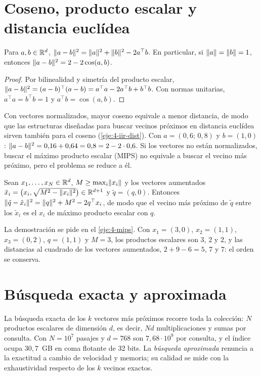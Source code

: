 \section{Coseno, producto escalar y distancia euclídea}

\begin{teorema}\label{teo:dist-coseno}
Para $a,b\in\mathbb{R}^{d}$, $\lVert a-b\rVert^{2}=\lVert a\rVert^{2}+\lVert b\rVert^{2}-2a^{\top}b$. En particular, si $\lVert a\rVert=\lVert b\rVert=1$, entonces $\lVert a-b\rVert^{2}=2-2\cos(a,b)$.
\end{teorema}

\begin{proof}
Por bilinealidad y simetría del producto escalar, $\lVert a-b\rVert^{2}=(a-b)^{\top}(a-b)=a^{\top}a-2a^{\top}b+b^{\top}b$. Con normas unitarias, $a^{\top}a=b^{\top}b=1$ y $a^{\top}b=\cos(a,b)$.
\end{proof}

Con vectores normalizados, mayor coseno equivale a menor distancia, de modo que las estructuras diseñadas para buscar vecinos próximos en distancia euclídea sirven también para el coseno (\cref{eje:4-iir-dist}). Con $a=(0{,}6;\,0{,}8)$ y $b=(1,0)$: $\lVert a-b\rVert^{2}=0{,}16+0{,}64=0{,}8=2-2\cdot 0{,}6$. Si los vectores no están normalizados, buscar el máximo producto escalar (MIPS) no equivale a buscar el vecino más próximo, pero el problema se reduce a él.

\begin{proposicion}\label{prop:mips}
Sean $x_1,\dots,x_N\in\mathbb{R}^{d}$, $M\ge\max_i\lVert x_i\rVert$ y los vectores aumentados $\tilde x_i=\bigl(x_i,\sqrt{M^{2}-\lVert x_i\rVert^{2}}\bigr)\in\mathbb{R}^{d+1}$ y $\tilde q=(q,0)$. Entonces $\lVert\tilde q-\tilde x_i\rVert^{2}=\lVert q\rVert^{2}+M^{2}-2q^{\top}x_i$, de modo que el vecino más próximo de $\tilde q$ entre los $\tilde x_i$ es el $x_i$ de máximo producto escalar con $q$.
\end{proposicion}

La demostración se pide en el \cref{eje:4-mips}. Con $x_1=(3,0)$, $x_2=(1,1)$, $x_3=(0,2)$, $q=(1,1)$ y $M=3$, los productos escalares son $3$, $2$ y $2$, y las distancias al cuadrado de los vectores aumentados, $2+9-6=5$, $7$ y $7$: el orden se conserva.

\section{Búsqueda exacta y aproximada}

La búsqueda exacta de los $k$ vectores más próximos recorre toda la colección: $N$ productos escalares de dimensión $d$, es decir, $Nd$ multiplicaciones y sumas por consulta. Con $N=10^{7}$ pasajes y $d=768$ son $7{,}68\cdot 10^{9}$ por consulta, y el índice ocupa $30{,}7$~GB en coma flotante de 32 bits. La \emph{búsqueda aproximada} renuncia a la exactitud a cambio de velocidad y memoria; su calidad se mide con la exhaustividad respecto de los $k$ vecinos exactos.

